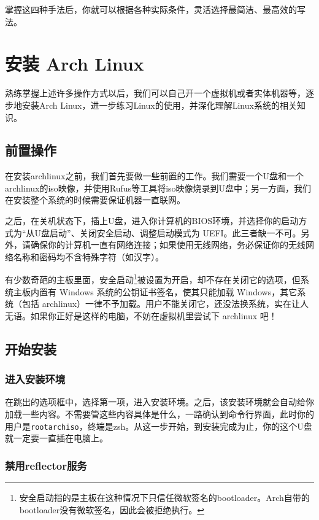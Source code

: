 \documentclass[../main.tex]{subfiles}
\begin{document}
掌握这四种手法后，你就可以根据各种实际条件，灵活选择最简洁、最高效的写法。

\section{安装 Arch Linux}

熟练掌握上述许多操作方式以后，我们可以自己开一个虚拟机或者实体机器等，逐步地安装Arch Linux，进一步练习Linux的使用，并深化理解Linux系统的相关知识。

\subsection{前置操作}

在安装archlinux之前，我们首先要做一些前置的工作。我们需要一个U盘和一个archlinux的iso映像，并使用Rufus等工具将iso映像烧录到U盘中；另一方面，我们在安装整个系统的时候需要保证机器一直联网。

之后，在关机状态下，插上U盘，进入你计算机的BIOS环境，并选择你的启动方式为“从U盘启动”、关闭安全启动、调整启动模式为 UEFI。此三者缺一不可。另外，请确保你的计算机一直有网络连接；如果使用无线网络，务必保证你的无线网络名称和密码均不含特殊字符（如汉字）。

\begin{note}
  有少数奇葩的主板里面，安全启动\footnote{安全启动指的是主板在这种情况下只信任微软签名的bootloader。Arch自带的bootloader没有微软签名，因此会被拒绝执行。}被设置为开启，却不存在关闭它的选项，但系统主板内置有 Windows 系统的公钥证书签名，使其只能加载 Windows，其它系统（包括 archlinux）一律不予加载。用户不能关闭它，还没法换系统，实在让人无语。如果你正好是这样的电脑，不妨在虚拟机里尝试下 archlinux 吧！
\end{note}

\subsection{开始安装}

\subsubsection{进入安装环境}

在跳出的选项框中，选择第一项，进入安装环境。之后，该安装环境就会自动给你加载一些内容。不需要管这些内容具体是什么，一路确认到命令行界面，此时你的用户是\texttt{root\@ archiso}，终端是zsh。从这一步开始，到安装完成为止，你的这个U盘就一定要一直插在电脑上。

\subsubsection{禁用reflector服务}
\end{document}
